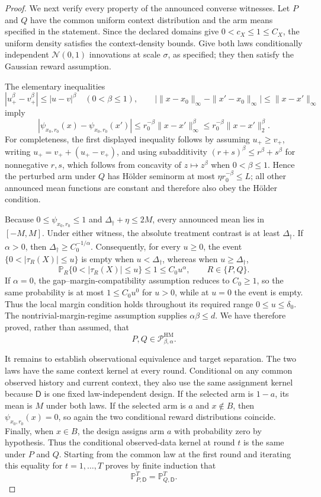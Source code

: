 \documentclass{article}
\begin{document}
\begin{proof}
We next verify every property of the announced converse witnesses.  Let \(P\) and \(Q\) have the common uniform context distribution and the arm means specified in the statement.  Since the declared domains give \(0<c_X\le 1\le C_X\), the uniform density satisfies the context-density bounds.  Give both laws conditionally independent \(\mathcal N(0,1)\) innovations at scale \(\sigma\), as specified; they then satisfy the Gaussian reward assumption.

The elementary inequalities
\[
|u_+^\beta-v_+^\beta|\le |u-v|^\beta
\quad(0<\beta\le1),
\qquad
\bigl|\|x-x_0\|_\infty-\|x'-x_0\|_\infty\bigr|
\le\|x-x'\|_\infty
\]
imply
\[
|\psi_{x_0,r_0}(x)-\psi_{x_0,r_0}(x')|
\le r_0^{-\beta}\|x-x'\|_\infty^\beta
\le r_0^{-\beta}\|x-x'\|_2^\beta.
\]
For completeness, the first displayed inequality follows by assuming \(u_+\ge v_+\), writing \(u_+=v_++(u_+-v_+)\), and using subadditivity
\((r+s)^\beta\le r^\beta+s^\beta\) for nonnegative \(r,s\), which follows from concavity of \(z\mapsto z^\beta\) when \(0<\beta\le1\).  Hence the perturbed arm under \(Q\) has Hölder seminorm at most \(\eta r_0^{-\beta}\le L\); all other announced mean functions are constant and therefore also obey the Hölder condition.

Because \(0\le\psi_{x_0,r_0}\le1\) and \(\Delta_\dagger+\eta\le2M\), every announced mean lies in \([-M,M]\).  Under either witness, the absolute treatment contrast is at least \(\Delta_\dagger\).  If \(\alpha>0\), then \(\Delta_\dagger\ge C_0^{-1/\alpha}\).  Consequently, for every \(u\ge0\), the event
\(\{0<|\tau_R(X)|\le u\}\) is empty when \(u<\Delta_\dagger\), whereas when \(u\ge\Delta_\dagger\),
\[
\mathbb P_R\{0<|\tau_R(X)|\le u\}
\le1\le C_0u^\alpha,
\qquad R\in\{P,Q\}.
\]
If \(\alpha=0\), the gap--margin-compatibility assumption reduces to \(C_0\ge1\), so the same probability is at most \(1\le C_0u^0\) for \(u>0\), while at \(u=0\) the event is empty.  Thus the local margin condition holds throughout its required range \(0\le u\le\delta_0\).  The nontrivial-margin-regime assumption supplies \(\alpha\beta\le d\).  We have therefore proved, rather than assumed, that
\[
P,Q\in\mathcal P_{\beta,\alpha}^{\mathrm{HM}}.
\]

It remains to establish observational equivalence and target separation.  The two laws have the same context kernel at every round.  Conditional on any common observed history and current context, they also use the same assignment kernel because \(\mathsf D\) is one fixed law-independent design.  If the selected arm is \(1-a\), its mean is \(M\) under both laws.  If the selected arm is \(a\) and \(x\notin B\), then
\(\psi_{x_0,r_0}(x)=0\), so again the two conditional reward distributions coincide.  Finally, when \(x\in B\), the design assigns arm \(a\) with probability zero by hypothesis.  Thus the conditional observed-data kernel at round \(t\) is the same under \(P\) and \(Q\).  Starting from the common law at the first round and iterating this equality for \(t=1,\ldots,T\) proves by finite induction that
\[
\mathbb P_{P,\mathsf D}^{T}=\mathbb P_{Q,\mathsf D}^{T}.
\]


\end{proof}
\end{document}
